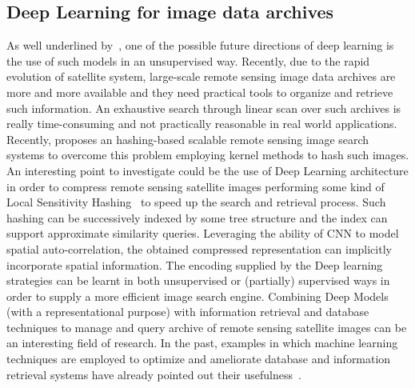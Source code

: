 \subsection{Deep Learning for image data archives}
As well underlined by~\cite{LeCun15}, one of the possible future directions of deep learning is the use of such models in an unsupervised way. Recently, due to the rapid evolution of satellite system, large-scale remote sensing image data archives are more and more available and they need practical tools to organize and retrieve such information. An exhaustive search through linear scan over such archives is really time-consuming and not practically reasonable in real world applications. Recently, \cite{DemirB16} proposes an hashing-based scalable remote sensing image search systems to overcome this problem employing kernel methods to hash such images. An interesting point to investigate could be the use of Deep Learning architecture in order to compress remote sensing satellite images performing some kind of Local Sensitivity Hashing~\cite{GionisIM99} to speed up the search and retrieval process. Such hashing can be successively indexed by some tree structure and the index can support approximate similarity queries. Leveraging the ability of CNN to model spatial auto-correlation, the obtained compressed representation can implicitly incorporate spatial information.
The encoding supplied by the Deep learning strategies can be learnt in both unsupervised or (partially) supervised ways in order to supply a more efficient image search engine.
Combining Deep Models (with a representational purpose) with information retrieval and database techniques to manage and query archive of remote sensing satellite images can be an interesting field of research. In the past, examples in which machine learning techniques are employed to optimize and ameliorate database and information retrieval systems have already pointed out their usefulness~\cite{AkdereCRUZ11,AkdereCRUZ12}.

